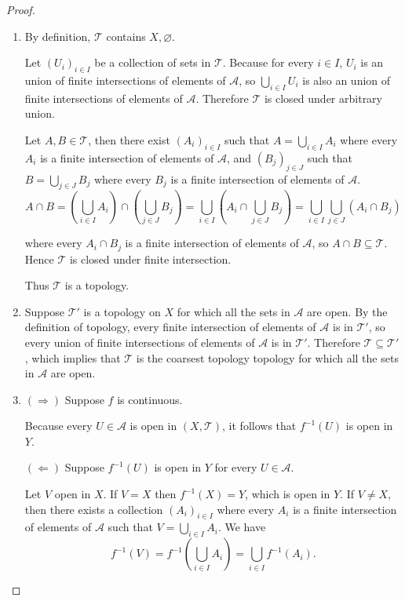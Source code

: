 \begin{proof}
	\begin{enumerate}[label={(\alph*)}]
		\item By definition, $\mathscr{T}$ contains $X, \varnothing$.

		      Let ${(U_{i})}_{i\in I}$ be a collection of sets in $\mathscr{T}$. Because for every $i\in I$, $U_{i}$ is an union of finite intersections of elements of $\mathscr{A}$, so $\bigcup_{i\in I}U_{i}$ is also an union of finite intersections of elements of $\mathscr{A}$. Therefore $\mathscr{T}$ is closed under arbitrary union.

		      Let $A, B\in\mathscr{T}$, then there exist ${(A_{i})}_{i\in I}$ such that $A = \bigcup_{i\in I}A_{i}$ where every $A_{i}$ is a finite intersection of elements of $\mathscr{A}$, and ${(B_{j})}_{j\in J}$ such that $B = \bigcup_{j\in J}B_{j}$ where every $B_{j}$ is a finite intersection of elements of $\mathscr{A}$.
		      \[
			      A\cap B = \left(\bigcup_{i\in I}A_{i}\right)\cap \left(\bigcup_{j\in J}B_{j}\right) = \bigcup_{i\in I}\left(A_{i}\cap \bigcup_{j\in J}B_{j}\right) = \bigcup_{i\in I}\bigcup_{j\in J}\left(A_{i}\cap B_{j}\right)
		      \]

		      where every $A_{i}\cap B_{j}$ is a finite intersection of elements of $\mathscr{A}$, so $A\cap B\subseteq \mathscr{T}$. Hence $\mathscr{T}$ is closed under finite intersection.

		      Thus $\mathscr{T}$ is a topology.
		\item Suppose $\mathscr{T}'$ is a topology on $X$ for which all the sets in $\mathscr{A}$ are open. By the definition of topology, every finite intersection of elements of $\mathscr{A}$ is in $\mathscr{T}'$, so every union of finite intersections of elements of $\mathscr{A}$ is in $\mathscr{T}'$. Therefore $\mathscr{T}\subseteq \mathscr{T}'$, which implies that $\mathscr{T}$ is the coarsest topology topology for which all the sets in $\mathscr{A}$ are open.
		\item $(\Rightarrow)$ Suppose $f$ is continuous.

		      Because every $U\in\mathscr{A}$ is open in $(X, \mathscr{T})$, it follows that $f^{-1}(U)$ is open in $Y$.

		      $(\Leftarrow)$ Suppose $f^{-1}(U)$ is open in $Y$ for every $U\in\mathscr{A}$.

		      Let $V$ open in $X$. If $V = X$ then $f^{-1}(X) = Y$, which is open in $Y$. If $V\ne X$, then there exists a collection ${(A_{i})}_{i\in I}$ where every $A_{i}$ is a finite intersection of elements of $\mathscr{A}$ such that $V = \bigcup_{i\in I}A_{i}$. We have
		      \[
			      f^{-1}(V) = f^{-1}\left(\bigcup_{i\in I}A_{i}\right) = \bigcup_{i\in I}f^{-1}(A_{i}).
		      \]


\end{enumerate}
\end{proof}
